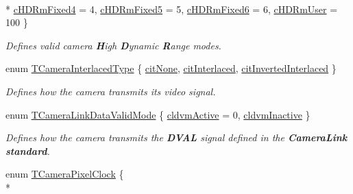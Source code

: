 \begin{DoxyCompactItemize}
\\*
\hyperlink{group___device_specific_interface_gga4d3429fb463a4c07dc7a32d43c04f5d4a4539c99bd77f866e34ede7b48328d618}{c\+H\+D\+Rm\+Fixed4} = 4, 
\hyperlink{group___device_specific_interface_gga4d3429fb463a4c07dc7a32d43c04f5d4ad6acbdcfad829c18b50b8e1980634c15}{c\+H\+D\+Rm\+Fixed5} = 5, 
\hyperlink{group___device_specific_interface_gga4d3429fb463a4c07dc7a32d43c04f5d4acff192bfba02959c224d8b5b24de692f}{c\+H\+D\+Rm\+Fixed6} = 6, 
\hyperlink{group___device_specific_interface_gga4d3429fb463a4c07dc7a32d43c04f5d4a554b3397bfdec597a76e72e48da725e4}{c\+H\+D\+Rm\+User} = 100
 \}
\begin{DoxyCompactList}\small\item\em Defines valid camera {\bfseries H}igh {\bfseries D}ynamic {\bfseries R}ange modes. \end{DoxyCompactList}\item 
enum \hyperlink{group___device_specific_interface_ga88ebb3c75921a96f51a3ea81ba253466}{T\+Camera\+Interlaced\+Type} \{ \hyperlink{group___device_specific_interface_gga88ebb3c75921a96f51a3ea81ba253466ab3ebcb585763bd02845416d8f15c2fc1}{cit\+None}, 
\hyperlink{group___device_specific_interface_gga88ebb3c75921a96f51a3ea81ba253466a4d1bbd65955f099c077a80584e5548ae}{cit\+Interlaced}, 
\hyperlink{group___device_specific_interface_gga88ebb3c75921a96f51a3ea81ba253466ac93bd7ca9a3bbffbbb90cfd49312b8ed}{cit\+Inverted\+Interlaced}
 \}
\begin{DoxyCompactList}\small\item\em Defines how the camera transmits its video signal. \end{DoxyCompactList}\item 
enum \hyperlink{group___device_specific_interface_gab4d89af185da36c227fc9dc396e97e9f}{T\+Camera\+Link\+Data\+Valid\+Mode} \{ \hyperlink{group___device_specific_interface_ggab4d89af185da36c227fc9dc396e97e9fab61a3a624d421a781bd38d743728f5c4}{cldvm\+Active} = 0, 
\hyperlink{group___device_specific_interface_ggab4d89af185da36c227fc9dc396e97e9fac65b4e5c699639a1aa262a97de2eedd4}{cldvm\+Inactive}
 \}
\begin{DoxyCompactList}\small\item\em Defines how the camera transmits the {\bfseries D\+V\+A\+L} signal defined in the {\bfseries Camera\+Link\textregistered{} standard}. \end{DoxyCompactList}\item 
enum \hyperlink{group___device_specific_interface_ga1f8b8cce27b21801b19c30f2aafae508}{T\+Camera\+Pixel\+Clock} \{ \\*

\end{DoxyCompactItemize}

